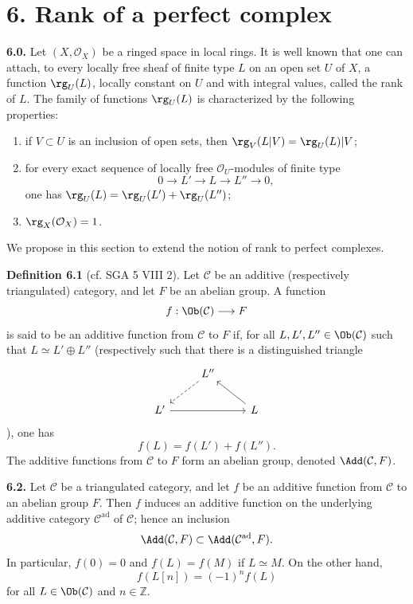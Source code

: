 \section*{6. Rank of a perfect complex}

\textbf{6.0.} Let \((X,\mathcal O_X)\) be a ringed space in local rings. It is well known that one can attach, to every locally free sheaf of finite type \(L\) on an open set \(U\) of \(X\), a function \(\rg_U(L)\), locally constant on \(U\) and with integral values, called the rank of \(L\). The family of functions \(\rg_U(L)\) is characterized by the following properties:
\begin{enumerate}[label=(\roman*)]
\item if \(V\subset U\) is an inclusion of open sets, then \(\rg_V(L|V)=\rg_U(L)|V\);
\item for every exact sequence of locally free \(\mathcal O_U\)-modules of finite type
\[
  0\longrightarrow L'\longrightarrow L\longrightarrow L''\longrightarrow 0,
\]
one has \(\rg_U(L)=\rg_U(L')+\rg_U(L'')\);
\item \(\rg_X(\mathcal O_X)=1\).
\end{enumerate}
We propose in this section to extend the notion of rank to perfect complexes.

\textbf{Definition 6.1} (cf. SGA 5 VIII 2). Let \(\mathcal C\) be an additive (respectively triangulated) category, and let \(F\) be an abelian group. A function
\[
  f:\Ob(\mathcal C)\longrightarrow F
\]
is said to be an additive function from \(\mathcal C\) to \(F\) if, for all \(L,L',L''\in\Ob(\mathcal C)\) such that \(L\simeq L'\oplus L''\) (respectively such that there is a distinguished triangle
\[
\begin{tikzcd}
& L'' \arrow[dl,dashed] & \\
L' \arrow[rr] && L \arrow[ul]
\end{tikzcd}
\]
), one has
\[
  f(L)=f(L')+f(L'').
\]
The additive functions from \(\mathcal C\) to \(F\) form an abelian group, denoted \(\Add(\mathcal C,F)\).

\textbf{6.2.} Let \(\mathcal C\) be a triangulated category, and let \(f\) be an additive function from \(\mathcal C\) to an abelian group \(F\). Then \(f\) induces an additive function on the underlying additive category \(\mathcal C^{\mathrm{ad}}\) of \(\mathcal C\); hence an inclusion
\[
  \Add(\mathcal C,F)\subset \Add(\mathcal C^{\mathrm{ad}},F).
\]
In particular, \(f(0)=0\) and \(f(L)=f(M)\) if \(L\simeq M\). On the other hand,
\[
  f(L[n])=(-1)^n f(L)
\]
for all \(L\in\Ob(\mathcal C)\) and \(n\in\mathbb Z\).

